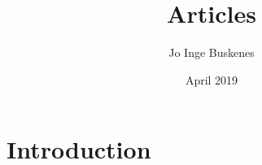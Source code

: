 \documentclass{article}
\title{Articles}
\author{Jo Inge Buskenes}
\date{April 2019}
\begin{document}
\maketitle

\section{Introduction}
\end{document}
